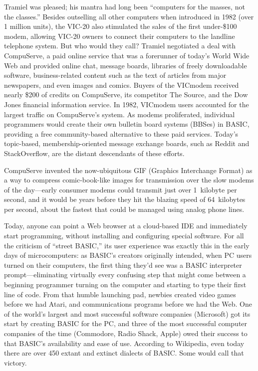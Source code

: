 Tramiel was pleased; his mantra had long been ``computers for the
masses, not the classes.''
Besides outselling all other
computers when introduced in 1982 (over 1 million units), the VIC-20
also stimulated the sales of the first under-\$100 modem, allowing
VIC-20 owners to connect their computers to the landline telephone
system.
But who would they call?
Tramiel negotiated a deal with CompuServe, a
paid online service that was a forerunner of today's World Wide Web and
provided online chat, message boards, libraries of freely downloadable
software, business-related content such as the text of articles from
major newspapers, and even images and comics.
Buyers of the VICmodem received nearly \$200 of credits on
CompuServe, its competitor The Source, and the Dow Jones financial
information service.
In 1982, VICmodem users accounted for the largest traffic on
CompuServe's system.
As modems proliferated, individual programmers would create their own
bulletin board systems (BBSes) in BASIC, providing a free
community-based alternative to these paid services.
Today's topic-based, membership-oriented message exchange boards, such
as Reddit and StackOverflow, are the distant descendants of these
efforts.

\begin{tangent}

CompuServe invented the now-ubiquitous GIF (Graphics
Interchange Format) as a way to compress comic-book-like images for
transmission over the slow modems of the day---early consumer modems
could transmit just over 1~kilobyte per second, and it would be years
before they hit the blazing speed of 64~kilobytes per second, about
the fastest that could be managed using analog phone lines.

\end{tangent}

Today, anyone can point
a Web browser at a cloud-based IDE
and immediately start programming, without
installing and configuring special
software.
For all the criticism of ``street BASIC,'' its user experience was
exactly this in the early days of microcomputers: as BASIC's creators
originally intended, when PC users turned on their computers, the
first thing they'd see was a BASIC interpreter prompt---eliminating
virtually every confusing step that might come between a beginning programmer
turning on the computer and starting to type their first line
of code.
From that humble launching pad, newbies
created video games before we had Atari,
and communications programs before we had the Web.
One of the world's largest and most
successful software companies (Microsoft) got its start by creating
BASIC for the PC, and three of the most successful computer companies
of the time (Commodore, Radio Shack, Apple) owed their success to
that BASIC's availability and ease of use.
According to Wikipedia, even today there are over 450 extant and extinct
dialects of BASIC.
Some would call that victory.

